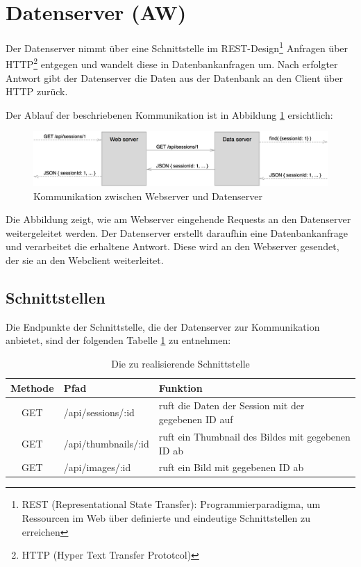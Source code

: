 \section{Datenserver (AW)}
\label{section_datenserver}
Der Datenserver nimmt über eine Schnittstelle im REST-Design\footnote{REST 
(Representational State Transfer): Programmierparadigma, um Ressourcen im Web über 
definierte und eindeutige Schnittstellen zu erreichen} Anfragen über HTTP\footnote{HTTP 
(Hyper Text Transfer Prototcol)} entgegen und wandelt diese in Datenbankanfragen um. 
Nach erfolgter Antwort gibt der Datenserver die Daten aus der Datenbank an den Client 
über HTTP zurück.

Der Ablauf der beschriebenen Kommunikation ist in Abbildung 
\ref{fig_kommunikation_webserver_datenserver} ersichtlich:

\begin{figure}[h]
	\centering
	\includegraphics[width=\textwidth]{bilder/abbildung_request_from_webserver_to_dataserver}
	\caption{Kommunikation zwischen Webserver und Datenserver}
	\label{fig_kommunikation_webserver_datenserver}
\end{figure}

Die Abbildung zeigt, wie am Webserver eingehende Requests an den Datenserver weitergeleitet werden.
Der Datenserver erstellt daraufhin eine Datenbankanfrage und verarbeitet die erhaltene 
Antwort. Diese wird an den Webserver gesendet, der sie an den Webclient weiterleitet.

\subsection{Schnittstellen}
Die Endpunkte der Schnittstelle, die der Datenserver zur Kommunikation anbietet, 
sind der folgenden Tabelle \ref{tab_dataserver_api_routes} zu entnehmen:

\begin{table}[h]
	\begin{center}
		\begin{tabularx}{\textwidth}{|c|l|X|}
			\hline
			\textbf{Methode} & \textbf{Pfad} & \textbf{Funktion}\\
			\hline
			GET & /api/sessions/:id & ruft die Daten der Session mit der gegebenen ID auf \\
			\hline
			GET & /api/thumbnails/:id & ruft ein Thumbnail des Bildes mit gegebenen ID ab \\
			\hline
			GET & /api/images/:id & ruft ein Bild mit gegebenen ID ab \\
			\hline
		\end{tabularx}
		\caption{Die zu realisierende Schnittstelle}
		\label{tab_dataserver_api_routes}
	\end{center}
\end{table}

